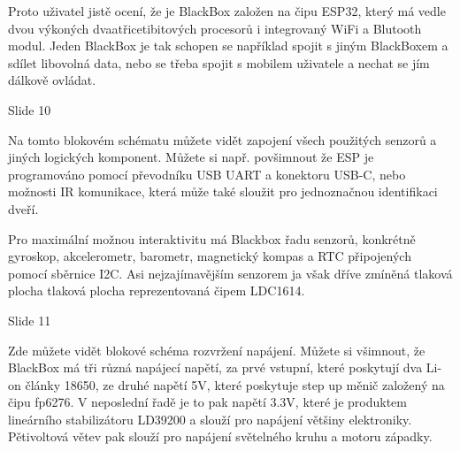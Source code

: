 Proto uživatel jistě ocení, že je BlackBox založen na čipu ESP32, 
který má vedle dvou výkoných dvaatřicetibitových procesorů i integrovaný WiFi a Blutooth modul. 
Jeden BlackBox je tak schopen se například spojit s jiným BlackBoxem a sdílet libovolná data, 
nebo se třeba spojit s mobilem uživatele a nechat se jím dálkově ovládat. %

% 



Slide 10

Na tomto blokovém schématu můžete vidět zapojení všech použitých senzorů a jiných logických komponent.
Můžete si např. povšimnout že ESP je programováno pomocí převodníku USB UART a konektoru USB-C,
nebo možnosti IR komunikace, která může také sloužit pro jednoznačnou identifikaci dveří. 

Pro maximální možnou interaktivitu má Blackbox řadu senzorů, 
konkrétně gyroskop, akcelerometr, barometr, magnetický kompas a RTC připojených pomocí sběrnice I2C. 
Asi nejzajímavějším senzorem ja však dříve zmíněná tlaková plocha tlaková plocha reprezentovaná čipem LDC1614. 




Slide 11

Zde můžete vidět blokové schéma rozvržení napájení.
Můžete si všimnout, že BlackBox má tři různá napájecí napětí, za prvé vstupní, 
které poskytují dva Li-on články 18650, 
ze druhé napětí 5V, které poskytuje step up měnič založený na čipu fp6276. 
V neposlední řadě je to pak napětí 3.3V,
které je produktem lineárního stabilizátoru LD39200 a slouží pro napájení většiny elektroniky.
Pětivoltová větev pak slouží pro napájení světelného kruhu a motoru západky.

